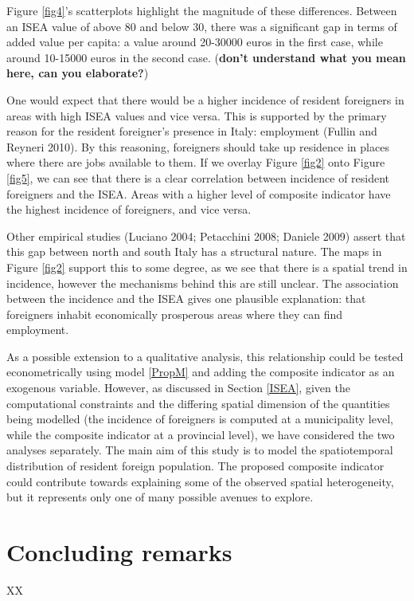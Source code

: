 \documentclass[10pt]{article}
\theoremstyle{definition}
\theoremstyle{plain}
\begin{document}
Figure \ref{fig4}'s scatterplots highlight the magnitude of these differences. Between an ISEA value of above 80 and below 30, there was a significant gap in terms of added value per capita: a value around 20-30000 euros in the first case, while around 10-15000 euros in the second case. (\textbf{don't understand what you mean here, can you elaborate?}) 

One would expect that there would be a higher incidence of resident foreigners in areas with high ISEA values and vice versa. This is supported by the primary reason for the resident foreigner's presence in Italy: employment (Fullin and Reyneri 2010). By this reasoning, foreigners should take up residence in places where there are jobs available to them. If we overlay Figure \ref{fig2} onto Figure \ref{fig5}, we can see that there is a clear correlation between incidence of resident foreigners and the ISEA. Areas with a higher level of composite indicator have the highest incidence of foreigners, and vice versa.

Other empirical studies (Luciano 2004; Petacchini 2008; Daniele 2009) assert that this gap between north and south Italy has a structural nature. The maps in Figure \ref{fig2} support this to some degree, as we see that there is a spatial trend in incidence, however the mechanisms behind this are still unclear. The association between the incidence and the ISEA gives one plausible explanation: that foreigners inhabit  economically prosperous areas where they can find employment.

As a possible extension to a qualitative analysis, this relationship could be tested econometrically using model \ref{PropM} and adding the composite indicator as an exogenous variable. However, as discussed in Section \ref{ISEA}, given the computational constraints and the differing spatial dimension of the quantities being modelled (the incidence of foreigners is computed at a municipality level, while the composite indicator at a provincial level), we have considered the two analyses separately. The main aim of this study is to model the spatiotemporal distribution of resident foreign population. The proposed composite indicator could contribute towards explaining some of the observed spatial heterogeneity, but it represents only one of many possible avenues to explore.

\section{Concluding remarks \label{CONC}}
XX
\end{document}
